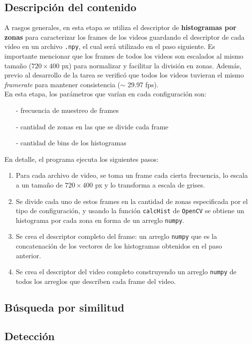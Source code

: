 \documentclass[14pt,letterpaper,hidelinks]{extarticle}
\begin{document}
\subsection{Descripción del contenido}
A rasgos generales, en esta etapa se utiliza el descriptor de \textbf{histogramas por zonas} para caracterizar los frames de los videos guardando el descriptor de cada video en un archivo \verb+.npy+, el cual será utilizado en el paso siguiente. Es importante mencionar que los frames de todos los videos son escalados al mismo tamaño ($720\times400$ px) para normalizar y facilitar la división en zonas. Además, previo al desarrollo de la tarea se verificó que todos los videos tuvieran el mismo \textit{framerate} para mantener consistencia ($\sim$ 29.97 fps).\\

En esta etapa, los parámetros que varían en cada configuración son:
\begin{itemize}
\item[-] frecuencia de muestreo de frames
\item[-] cantidad de zonas en las que se divide cada frame
\item[-] cantidad de bins de los histogramas 
\end{itemize}

En detalle, el programa ejecuta los siguientes pasos:
\begin{enumerate}
\item Para cada archivo de video, se toma un frame cada cierta frecuencia, lo escala a un tamaño de $720\times400$ px y lo transforma a escala de grises.
\item Se divide cada uno de estos frames en la cantidad de zonas especificada por el tipo de configuración, y usando la función \verb+calcHist+ de \verb+OpenCV+ se obtiene un histograma por cada zona en forma de un arreglo \verb+numpy+.
\item Se crea el descriptor completo del frame: un arreglo \verb+numpy+ que es la concatenación de los vectores de los histogramas obtenidos en el paso anterior.
\item Se crea el descriptor del video completo construyendo un arreglo \verb+numpy+ de todos los arreglos que describen cada frame del video.
\end{enumerate}
\subsection{Búsqueda por similitud}
\subsection{Detección}
 
\end{document}
